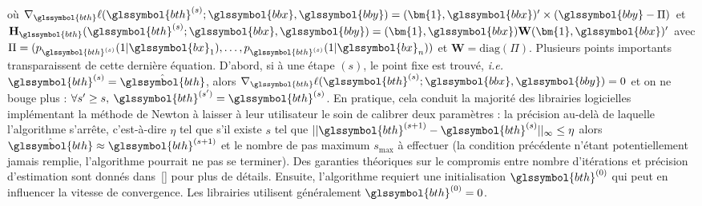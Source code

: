 où $ \nabla_{\glssymbol{bth}} \ell(\glssymbol{bth}^{(s)};\glssymbol{bbx},\glssymbol{bby}) = (\bm{1},\glssymbol{bbx})' \times (\glssymbol{bby} - \Pi)$ et $\mathbf{H}_{{\glssymbol{bth}}}(\glssymbol{bth}^{(s)};\glssymbol{bbx},\glssymbol{bby}) = (\bm{1},\glssymbol{bbx}) \mathbf{W} (\bm{1},\glssymbol{bbx})'$ avec $\Pi = (p_{\glssymbol{bth}^{(s)}}(1|\glssymbol{bx}_1),\dots,p_{\glssymbol{bth}^{(s)}}(1|\glssymbol{bx}_n))$ et $\mathbf{W} = \text{diag}(\Pi)$. Plusieurs points importants transparaissent de cette dernière équation. D'abord, si à une étape $(s)$, le point fixe est trouvé, \textit{i.e.}\ $\glssymbol{bth}^{(s)} = \hat{\glssymbol{bth}}$, alors $\nabla_{\glssymbol{bth}} \ell(\glssymbol{bth}^{(s)};\glssymbol{bbx},\glssymbol{bby}) = 0$ et on ne bouge plus : $\forall s' \geq s, \: \glssymbol{bth}^{(s')} = \glssymbol{bth}^{(s)}$. En pratique, cela conduit la majorité des librairies logicielles implémentant la méthode de Newton à laisser à leur utilisateur le soin de calibrer deux paramètres : la précision au-delà de laquelle l'algorithme s'arrête, c'est-à-dire $\eta$ tel que s'il existe $s$ tel que $||\glssymbol{bth}^{(s+1)} - \glssymbol{bth}^{(s)}||_{\infty} \leq \eta$ alors $\hat{\glssymbol{bth}} \approx \glssymbol{bth}^{(s+1)}$ et le nombre de pas maximum $s_{\text{max}}$ à effectuer (la condition précédente n'étant potentiellement jamais remplie, l'algorithme pourrait ne pas se terminer). Des garanties théoriques sur le compromis entre nombre d'itérations et précision d'estimation sont donnés dans~\ref{} pour plus de détails. Ensuite, l'algorithme requiert une initialisation $\glssymbol{bth}^{(0)}$ qui peut en influencer la vitesse de convergence. Les librairies utilisent généralement $\glssymbol{bth}^{(0)}=0$.


